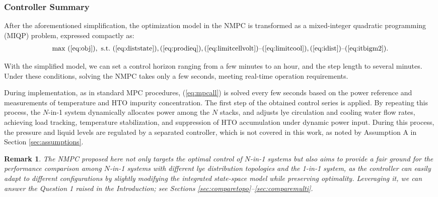 \documentclass[review,3p,10pt]{elsarticle}
\newtheorem{remark}{Remark}
\begin{document}
\subsubsection{Controller Summary}
\label{sec:controlsummary}

After the aforementioned simplification, the optimization model in the NMPC is transformed as a mixed-integer quadratic programming (MIQP) problem, expressed compactly as:
\begin{align}
  \max\ (\ref{eq:obj}), \ \text{s.t.} \ (\ref{eq:diststate}), (\ref{eq:prodieq}), (\ref{eq:limitcellvolt}){\text{--}}(\ref{eq:limitcool}),(\ref{eq:idist}){\text{--}}(\ref{eq:itbigm2}).    \label{eq:mpcall}
\end{align}

With the simplified model, we can set a control horizon ranging from a few minutes to an hour, and the step length to several minutes. %
Under these conditions, solving the NMPC takes only a few seconds, meeting real-time operation requirements.

During implementation, as in standard MPC procedures, %
(\ref{eq:mpcall}) is solved every few seconds based on the power reference and measurements of temperature and HTO impurity concentration. The first step of the obtained control series is applied. %
By repeating this process, the $N$-in-1 system dynamically allocates power among the $N$ stacks, and adjusts lye circulation and cooling water flow rates, achieving load tracking, temperature stabilization, and suppression of HTO accumulation under dynamic power input. During this process, the pressure and liquid levels are regulated by a separated controller, which is not covered in this work, as noted by Assumption A in Section \ref{sec:assumptions}.

\begin{remark}
	\label{remark:2}
	The NMPC proposed here not only targets the optimal control of $N$-in-1 systems but also aims to provide a fair ground for the performance comparison among $N$-in-1 systems with different lye distribution topologies and the 1-in-1 system, as the controller can easily adapt to different configurations by slightly modifying the integrated state-space model while preserving optimality. Leveraging it, we can answer the Question 1 raised in the Introduction; see Sections \ref{sec:comparetopo}--\ref{sec:comparemulti}.
\end{remark}
\end{document}
